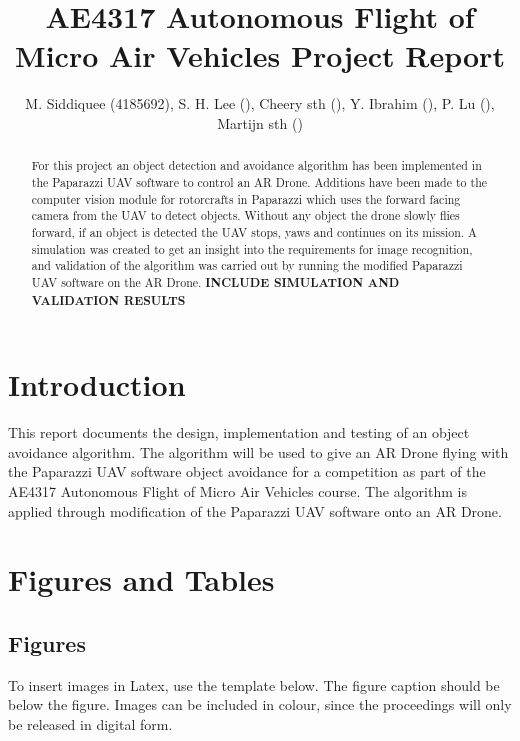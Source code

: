 \documentclass{article}
\title{AE4317 Autonomous Flight of Micro Air Vehicles Project Report}
\author{M. Siddiquee (4185692), S. H. Lee (), Cheery sth (), Y. Ibrahim (), P. Lu (), Martijn sth ()}
\begin{document}
\maketitle

\begin{abstract}
For this project an object detection and avoidance algorithm has been implemented in the Paparazzi UAV software to control an AR Drone. Additions have been made to the computer vision module for rotorcrafts in Paparazzi which uses the forward facing camera from the UAV to detect objects. Without any object the drone slowly flies forward, if an object is detected the UAV stops, yaws and continues on its mission. A simulation was created to get an insight into the requirements for image recognition, and validation of the algorithm was carried out by running the modified Paparazzi UAV software on the AR Drone. \textbf{INCLUDE SIMULATION AND VALIDATION RESULTS}
\end{abstract}

\section{Introduction} \label{section:introduction}


This report documents the design, implementation and testing of an object avoidance algorithm. The algorithm will be used to give an AR Drone flying with the Paparazzi UAV software object avoidance for a competition as part of the AE4317 Autonomous Flight of Micro Air Vehicles course. The algorithm is applied through modification of the Paparazzi UAV software onto an AR Drone.


\section{Figures and Tables}
\subsection{Figures}
To insert images in Latex, use the template below. The figure caption should be below the figure. Images can be included in colour, since the proceedings will only be released in digital form. 
\end{document}
